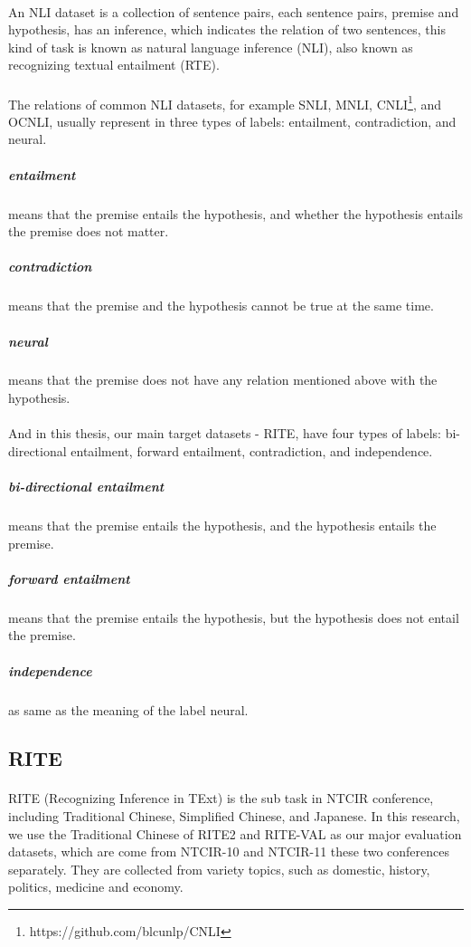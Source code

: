 \documentclass{article}
\begin{document}
\begin{CJK*}{UTF8}{bsmi}
\paragraph{}
An NLI dataset is a collection of sentence pairs, each sentence pairs, premise and hypothesis, has an inference, which indicates the relation of two sentences, this kind of task is known as natural language inference (NLI), also known as recognizing textual entailment (RTE).

\paragraph{}
The relations of common NLI datasets, for example SNLI\cite{snli:emnlp2015}, MNLI\cite{N18-1101}, CNLI\footnote{\label{cnli}https://github.com/blcunlp/CNLI}, and OCNLI\cite{ocnli}, usually represent in three types of labels: entailment, contradiction, and neural.

\subparagraph{entailment} means that the premise entails the hypothesis, and whether the hypothesis entails the premise does not matter.
\subparagraph{contradiction} means that the premise and the hypothesis cannot be true at the same time.
\subparagraph{neural} means that the premise does not have any relation mentioned above with the hypothesis.

\paragraph{}
And in this thesis, our main target datasets - RITE, have four types of labels: bi-directional entailment, forward entailment, contradiction, and independence.

\subparagraph{bi-directional entailment} means that the premise entails the hypothesis, and the hypothesis entails the premise.
\subparagraph{forward entailment} means that the premise entails the hypothesis, but the hypothesis does not entail the premise.
\subparagraph{independence} as same as the meaning of the label neural.

\subsection{RITE}
\paragraph{}
RITE (Recognizing Inference in TExt) is the sub task in NTCIR conference, including Traditional Chinese, Simplified Chinese, and Japanese. In this research, we use the Traditional Chinese of RITE2 and RITE-VAL as our major evaluation datasets, which are come from NTCIR-10\cite{ntcir10rite2} and NTCIR-11\cite{ntcir11rite-val} these two conferences separately. They are collected from variety topics, such as domestic, history, politics, medicine and economy.


\end{CJK*}
\end{document}
